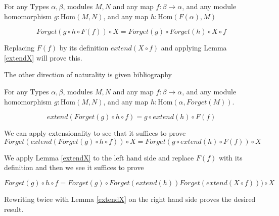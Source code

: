 \documentclass[12pt]{article} %
\theoremstyle{definition}
\theoremstyle{definition}
\theoremstyle{definition}
\theoremstyle{definition}
\begin{document}
\lemma 
For any Types $\alpha, \beta$, modules $M, N$ and any map $f : \beta \to \alpha$, and any module homomorphism 
$g : \text{Hom}(M, N)$, and any map $h : \text{Hom}(F(\alpha), M)$

\begin{equation}
  Forget(g \circ h \circ F(f)) \circ X = Forget(g) \circ Forget(h) \circ X \circ f
\end{equation}

Replacing $F(f)$ by its definition $extend (X \circ f)$ and applying Lemma \ref{extendX} will prove this.

The other direction of naturality is given bibliography

\lemma
For any Types $\alpha, \beta$, modules $M, N$ and any map $f : \beta \to \alpha$, and any module homomorphism 
$g : \text{Hom}(M, N)$, and any map $h : \text{Hom}(\alpha, Forget(M))$.

\begin{equation}
  extend(Forget (g) \circ h \circ f) = g \circ extend (h) \circ F(f)
\end{equation}

We can apply extensionality to see that it suffices to prove
\begin{equation}
  Forget(extend(Forget (g) \circ h \circ f)) \circ X = Forget(g \circ extend (h) \circ F(f)) \circ X
\end{equation}

We apply Lemma \ref{extendX} to the left hand side and replace $F(f)$ with its definition and 
then we see it suffices to prove

\begin{equation}
    Forget (g) \circ h \circ f = Forget(g) \circ Forget(extend (h)) Forget(extend (X \circ f))) \circ X
\end{equation}

Rewriting twice with Lemma \ref{extendX} on the right hand side proves the desired result.
\end{document}
